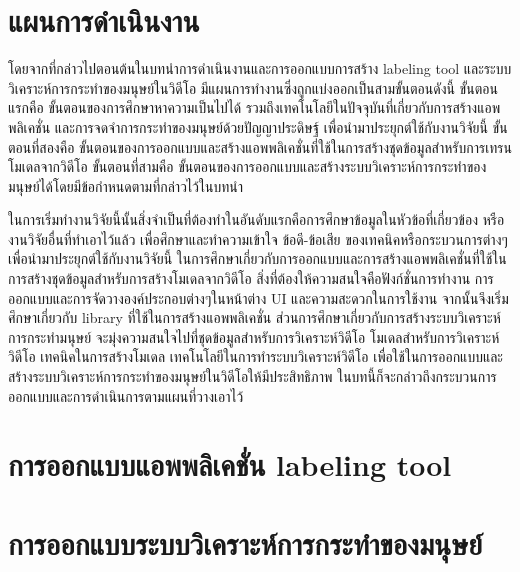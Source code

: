 \vspace{3mm}
\section{แผนการดำเนินงาน}
โดยจากที่กล่าวไปตอนต้นในบทนำการดำเนินงานและการออกแบบการสร้าง labeling tool 
และระบบวิเคราะห์การกระทำของมนุษย์ในวิดีโอ มีแผนการทำงานซึ่งถูกแบ่งออกเป็นสามขั้นตอนดังนี้ 
ขั้นตอนแรกคือ ขั้นตอนของการศึกษาหาความเป็นไปได้ รวมถึงเทคโนโลยีในปัจจุบันที่เกี่ยวกับการสร้างแอพพลิเคชั่น และการจดจำการกระทำของมนุษย์ด้วยปัญญาประดิษฐ์ เพื่อนำมาประยุกต์ใช้กับงานวิจัยนี้
ขั้นตอนที่สองคือ ขั้นตอนของการออกแบบและสร้างแอพพลิเคชั่นที่ใช้ในการสร้างชุดข้อมูลสำหรับการเทรนโมเดลจากวิดีโอ
ขั้นตอนที่สามคือ ขั้นตอนของการออกแบบและสร้างระบบวิเคราะห์การกระทำของมนุษย์ได้โดยมีข้อกำหนดตามที่กล่าวไว้ในบทนำ

ในการเริ่มทำงานวิจัยนี้นั้นสิ่งจำเป็นที่ต้องทำในอันดับแรกคือการศึกษาข้อมูลในหัวข้อที่เกี่ยวข้อง หรืองานวิจัยอื่นที่ทำเอาไว้แล้ว
เพื่อศึกษาและทำความเข้าใจ ข้อดี-ข้อเสีย ของเทคนิคหรือกระบวนการต่างๆ เพื่อนำมาประยุกต์ใช้กับงานวิจัยนี้
ในการศึกษาเกี่ยวกับการออกแบบและการสร้างแอพพลิเคชั่นที่ใช้ในการสร้างชุดข้อมูลสำหรับการสร้างโมเดลจากวิดีโอ 
สิ่งที่ต้องให้ความสนใจคือฟังก์ชั่นการทำงาน การออกแบบและการจัดวางองค์ประกอบต่างๆในหน้าต่าง UI
และความสะดวกในการใช้งาน จากนั้นจึงเริ่มศึกษาเกี่ยวกับ library ที่ใช้ในการสร้างแอพพลิเคชั่น
ส่วนการศึกษาเกี่ยวกับการสร้างระบบวิเคราะห์การกระทำมนุษย์ จะมุ่งความสนใจไปที่ชุดข้อมูลสำหรับการวิเคราะห์วิดีโอ
โมเดลสำหรับการวิเคราะห์วิดีโอ เทคนิคในการสร้างโมเดล เทคโนโลยีในการทำระบบวิเคราะห์วิดีโอ
เพื่อใช้ในการออกแบบและสร้างระบบวิเคราะห์การกระทำของมนุษย์ในวิดีโอให้มีประสิทธิภาพ
ในบทนี้ก็จะกล่าวถึงกระบวนการออกแบบและการดำเนินการตามแผนที่วางเอาไว้

\clearpage
\section{การออกแบบแอพพลิเคชั่น labeling tool}


\clearpage
\section{การออกแบบระบบวิเคราะห์การกระทำของมนุษย์}
